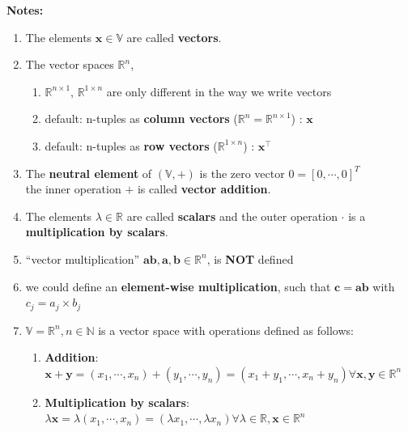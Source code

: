\textbf{Notes:}
\begin{enumerate}[itemsep=0.2cm]
    \item The elements $\mathbf{x}\in\mathbb{V}$ are called \textbf{vectors}.
        \item The vector spaces $\mathbb{R}^n$, 
        \begin{enumerate}
            \item $\mathbb{R}^{n\times 1}$, $\mathbb{R}^{1\times n}$ are only different in the way we write vectors
        
            \item default: n-tuples as \textbf{column vectors} ($\mathbb{R}^n = \mathbb{R}^{n \times 1}$) : $\mathbf{x}$
    
            \item default: n-tuples as \textbf{row vectors} ($\mathbb{R}^{1 \times n}$) : $\mathbf{x}^\top$
        \end{enumerate}

    \item The \textbf{neutral element} of $(\mathbb{V}, +)$ is the zero vector $0 = [0, \cdots, 0]^T$ \\
    the inner operation $+$ is called \textbf{vector addition}.

    \item The elements $\lambda\in\mathbb{R}$ are called \textbf{scalars} and the outer operation $\cdot$ is a \textbf{multiplication by scalars}.

    \item “vector multiplication” $\mathbf{ab, a, b} \in \mathbb{R}^n$, is \textbf{NOT} defined

    \item we could define an \textbf{element-wise multiplication}, such that $\mathbf{c = ab}$ with $c_j = a_j \times b_j$

    \item $\mathbb{V} = \mathbb{R}^n, n \in \mathbb{N}$ is a vector space with operations defined as follows:
    \begin{enumerate}
        \item \textbf{Addition}:\\ $\mathbf{x+y} = (x_1, \cdots, x_n)+(y_1, \cdots, y_n) = (x_1+y_1, \cdots, x_n+y_n) \forall \mathbf{x, y} \in \mathbb{R}^n$

        \item \textbf{Multiplication by scalars}:\\ $\lambda\mathbf{x} = \lambda(x_1, \cdots, x_n) = (\lambda x_1, \cdots, \lambda x_n) \forall \lambda \in \mathbb{R}, \mathbf{x} \in \mathbb{R}^n$
        

\end{enumerate}
\end{enumerate}
